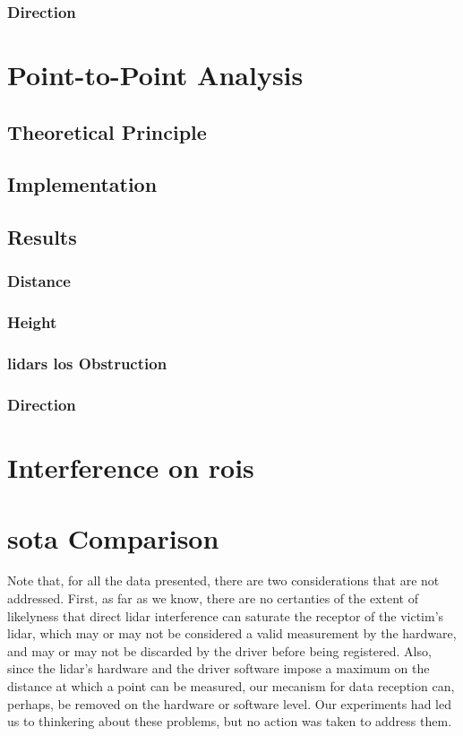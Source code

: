 \subsubsection{Direction}

\section{Point-to-Point Analysis}
\subsection{Theoretical Principle}
\subsection{Implementation}
\subsection{Results}
\subsubsection{Distance}
\subsubsection{Height}
\subsubsection{\acp{lidar} \ac{los} Obstruction}
\subsubsection{Direction}

\section{Interference on \acp{roi}}

\section{\acl{sota} Comparison}
Note that, for all the data presented, there are two considerations that are not addressed. First, as far as we know, there are no certanties of the extent of likelyness that direct \ac{lidar} interference can saturate the receptor of the victim's \ac{lidar}, which may or may not be considered a valid measurement by the hardware, and may or may not be discarded by the driver before being registered. Also, since the \ac{lidar}'s hardware and the driver software impose a maximum on the distance at which a point can be measured, our mecanism for data reception can, perhaps, be removed on the hardware or software level. Our experiments had led us to thinkering about these problems, but no action was taken to address them.
